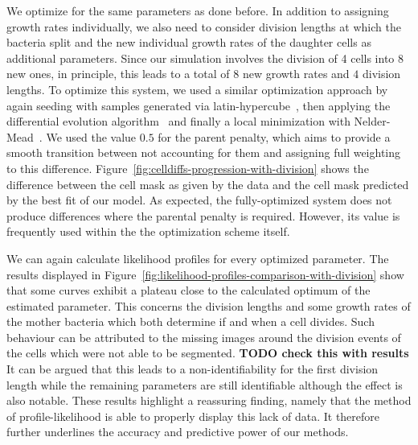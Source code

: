 \documentclass{article}
\begin{document}
We optimize for the same parameters as done before.
In addition to assigning growth rates individually, we also need to consider division lengths at
which the bacteria split and the new individual growth rates of the daughter cells as additional
parameters.
Since our simulation involves the division of 4 cells into 8 new ones, in principle, this leads
to a total of $8$ new growth rates and $4$ division lengths.
To optimize this system, we used a similar optimization approach by again seeding with samples
generated via latin-hypercube~\cite{McKay1979}, then applying the differential evolution
algorithm~\cite{Storn1997} and finally a local minimization with Nelder-Mead~\cite{Gao2010}.
We used the value $0.5$ for the parent penalty, which aims to provide a smooth transition between
not accounting for them and assigning full weighting to this difference.
Figure~\ref{fig:celldiffs-progression-with-division} shows the difference between the cell mask as
given by the data and the cell mask predicted by the best fit of our model.
As expected, the fully-optimized system does not produce differences where the parental penalty is
required.
However, its value is frequently used within the the optimization scheme itself.

We can again calculate likelihood profiles for every optimized parameter.
The results displayed in Figure~\ref{fig:likelihood-profiles-comparison-with-division} show that
some curves exhibit a plateau close to the calculated optimum of the estimated parameter.
This concerns the division lengths and some growth rates of the mother bacteria which both determine
if and when a cell divides.
Such behaviour can be attributed to the missing images around the division events of the cells which
were not able to be segmented.
\textbf{TODO check this with results}
It can be argued that this leads to a non-identifiability for the first division length while the
remaining parameters are still identifiable although the effect is also notable.
These results highlight a reassuring finding, namely that the method of profile-likelihood is able
to properly display this lack of data.
It therefore further underlines the accuracy and predictive power of our methods.
\end{document}
